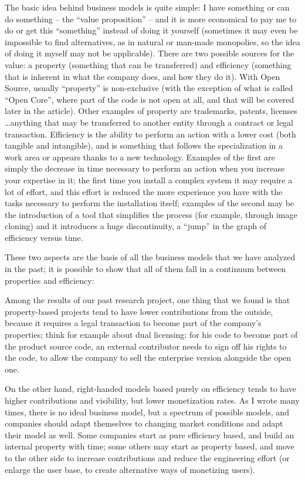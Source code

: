 The basic idea behind business models is quite simple: I have something or can
do something -- the ``value proposition'' -- and it is more economical to pay me to do or get this ``something'' instead of doing it yourself (sometimes it may even be impossible to find alternatives, as in natural or man-made monopolies, so the idea of doing it myself may not be applicable). 
There are two possible sources for the value: a property (something that can be
transferred) and efficiency (something that is inherent in what the company does, and how they do it). With Open Source, usually ``property'' is non-exclusive (with the exception of what is called ``Open Core'', where part of the code is not open at all, and that will be covered later in the article). Other examples of property are trademarks, patents, licenses \dots anything that may be transferred to another entity through a contract or legal transaction.
Efficiency is the ability to perform an action with a lower cost (both tangible
and intangible), and is something that follows the specialization in a work area
or appears thanks to a new technology. Examples of the first are simply the
decrease in time necessary to perform an action when you increase your expertise
in it; the first time you install a complex system it may require a lot of effort, and this effort is reduced the more experience you have with the tasks necessary to perform the installation itself; examples of the second may be the introduction of a tool that simplifies the process (for example, through image cloning) and it introduces a huge discontinuity, a ``jump'' in the graph of efficiency versus time.

These two aspects are the basis of all the business models that we have analyzed
in the past; it is possible to show that all of them fall in a continuum between
properties and efficiency:

Among the results of our past research project, one thing that we found is that
property-based projects tend to have lower contributions from the outside,
because it requires a legal transaction to become part of the company’s
properties; think for example about dual licensing: for his code to become part of the product source code, an external contributor needs to sign off his rights to the code, to allow the company to sell the enterprise version alongside the open one. 

On the other hand, right-handed models based purely on efficiency tends to have
higher contributions and visibility, but lower monetization rates. As I wrote
many times, there is no ideal business model, but a spectrum of possible models,
and companies should adapt themselves to changing market conditions and adapt
their model as well. Some companies start as pure efficiency based, and build an
internal property with time; some others may start as property based, and move
to the other side to increase contributions and reduce the engineering effort
(or enlarge the user base, to create alternative ways of monetizing users).


